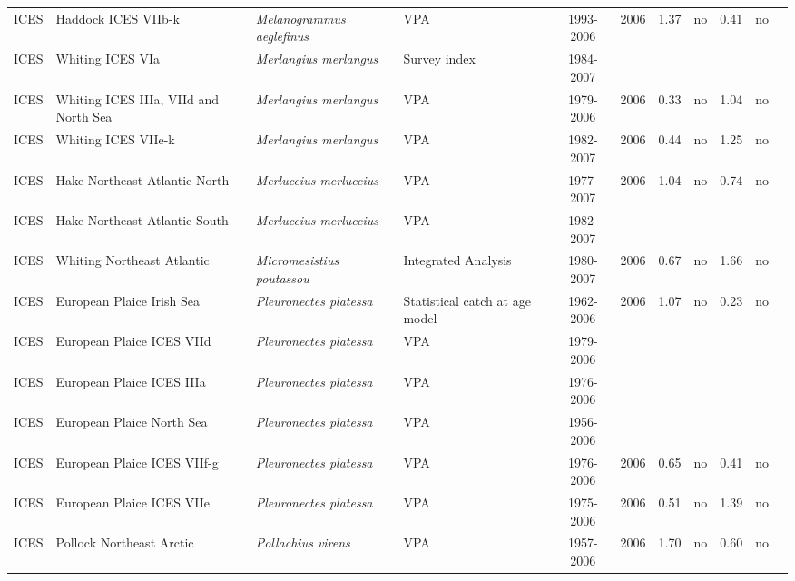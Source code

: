 \begin{longtable}{p{1.8cm}p{3.5cm}p{3.5cm}p{3cm}cccp{0.9cm}cp{0.9cm}c}
  ICES & Haddock ICES VIIb-k & \textit{Melanogrammus aeglefinus} & VPA & 1993-2006 & 2006 & 1.37 & no & 0.41 & no & \cite{ICES-WGSSDS-2007.pdf} \\ 
  ICES & Whiting ICES VIa & \textit{Merlangius merlangus} & Survey index & 1984-2007 &  &  &  &  &  & \cite{ICES-WGNSDS-2007.pdf} \\ 
  ICES & Whiting ICES IIIa, VIId and North Sea & \textit{Merlangius merlangus} & VPA & 1979-2006 & 2006 & 0.33 & no & 1.04 & no & \cite{ICES-WGNSSK-2007.pdf} \\ 
  ICES & Whiting ICES VIIe-k & \textit{Merlangius merlangus} & VPA & 1982-2007 & 2006 & 0.44 & no & 1.25 & no & \cite{ICES-WGSSDS-2007.pdf} \\ 
  ICES & Hake Northeast Atlantic North & \textit{Merluccius merluccius} & VPA & 1977-2007 & 2006 & 1.04 & no & 0.74 & no & \cite{ICES-WGHMM-2007.pdf} \\ 
  ICES & Hake Northeast Atlantic South & \textit{Merluccius merluccius} & VPA & 1982-2007 &  &  &  &  &  & \cite{ICES-WGHMM-2007.pdf} \\ 
  ICES & Whiting Northeast Atlantic & \textit{Micromesistius poutassou} & Integrated Analysis & 1980-2007 & 2006 & 0.67 & no & 1.66 & no & \cite{ICES-WGNPBW-2007.pdf} \\ 
  ICES & European Plaice Irish Sea & \textit{Pleuronectes platessa} & Statistical catch at age model & 1962-2006 & 2006 & 1.07 & no & 0.23 & no & \cite{ICES-WGNSDS-2007.pdf} \\ 
  ICES & European Plaice ICES VIId & \textit{Pleuronectes platessa} & VPA & 1979-2006 &  &  &  &  &  & \cite{ICES-WGNSSK-2007.pdf} \\ 
  ICES & European Plaice ICES IIIa & \textit{Pleuronectes platessa} & VPA & 1976-2006 &  &  &  &  &  & \cite{ICES-WGNSSK-2007.pdf} \\ 
  ICES & European Plaice North Sea & \textit{Pleuronectes platessa} & VPA & 1956-2006 &  &  &  &  &  & \cite{ICES-WGNSSK-2007.pdf} \\ 
  ICES & European Plaice ICES VIIf-g & \textit{Pleuronectes platessa} & VPA & 1976-2006 & 2006 & 0.65 & no & 0.41 & no & \cite{ICES-WGSSDS-2007.pdf} \\ 
  ICES & European Plaice ICES VIIe & \textit{Pleuronectes platessa} & VPA & 1975-2006 & 2006 & 0.51 & no & 1.39 & no & \cite{ICES-WGSSDS-2007.pdf} \\ 
  ICES & Pollock Northeast Arctic & \textit{Pollachius virens} & VPA & 1957-2006 & 2006 & 1.70 & no & 0.60 & no & \cite{ICES-AFWG-2007.pdf} \\ 

\end{longtable}
